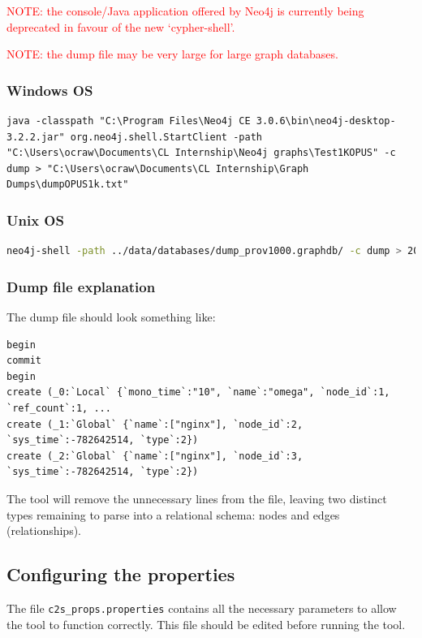 \documentclass[letterpaper]{ltxdoc}
\begin{document}
\medskip

\textcolor{red}{NOTE: the console/Java application offered by Neo4j is currently being deprecated in favour of the new `cypher-shell'.}

\medskip

\textcolor{red}{NOTE: the dump file may be very large for large graph databases.}

\subsubsection{Windows OS}
\begin{lstlisting}[style=DOS]
java -classpath "C:\Program Files\Neo4j CE 3.0.6\bin\neo4j-desktop-3.2.2.jar" org.neo4j.shell.StartClient -path "C:\Users\ocraw\Documents\CL Internship\Neo4j graphs\Test1KOPUS" -c dump > "C:\Users\ocraw\Documents\CL Internship\Graph Dumps\dumpOPUS1k.txt"
\end{lstlisting}

\subsubsection{Unix OS}
\begin{lstlisting}[language=bash, breaklines=true, postbreak=\mbox{\textcolor{red}{$\hookrightarrow$}\space}, backgroundcolor=\color{gray}, basicstyle=\color{white}\ttfamily]
neo4j-shell -path ../data/databases/dump_prov1000.graphdb/ -c dump > 2017-08-01-dump.txt
\end{lstlisting}


\subsubsection{Dump file explanation}
The dump file should look something like:

\begin{verbatim}
begin
commit
begin
create (_0:`Local` {`mono_time`:"10", `name`:"omega", `node_id`:1, `ref_count`:1, ...
create (_1:`Global` {`name`:["nginx"], `node_id`:2, `sys_time`:-782642514, `type`:2})
create (_2:`Global` {`name`:["nginx"], `node_id`:3, `sys_time`:-782642514, `type`:2})
\end{verbatim}

The tool will remove the unnecessary lines from the file, leaving two distinct types remaining to parse into a relational schema: nodes and edges (relationships).


\subsection{Configuring the properties}
\label{ss:prop}
The file \texttt{c2s\_props.properties} contains all the necessary parameters to allow the tool to function correctly. This file should be edited before running the tool.
\end{document}
